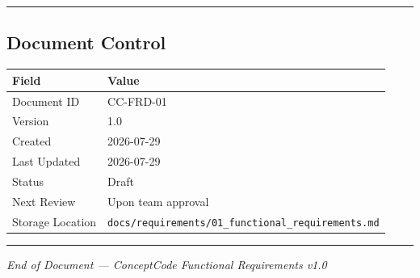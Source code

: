 \documentclass[
]{article}
\begin{document}
\begin{center}\rule{0.5\linewidth}{0.5pt}\end{center}

\subsection{Document Control}\label{document-control}

\begin{longtable}[]{@{}ll@{}}
\toprule\noalign{}
Field & Value \\
\midrule\noalign{}
\endhead
\bottomrule\noalign{}
\endlastfoot
Document ID & CC-FRD-01 \\
Version & 1.0 \\
Created & 2026-07-29 \\
Last Updated & 2026-07-29 \\
Status & Draft \\
Next Review & Upon team approval \\
Storage Location &
\texttt{docs/requirements/01\_functional\_requirements.md} \\
\end{longtable}

\begin{center}\rule{0.5\linewidth}{0.5pt}\end{center}

\emph{End of Document --- ConceptCode Functional Requirements v1.0}
\end{document}
